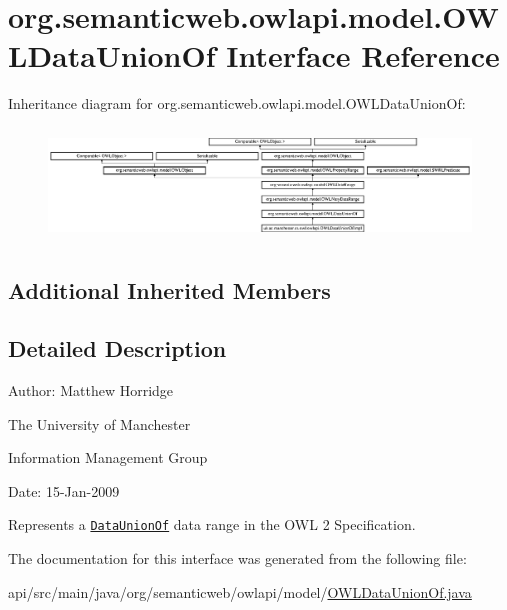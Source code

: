 \hypertarget{interfaceorg_1_1semanticweb_1_1owlapi_1_1model_1_1_o_w_l_data_union_of}{\section{org.\-semanticweb.\-owlapi.\-model.\-O\-W\-L\-Data\-Union\-Of Interface Reference}
\label{interfaceorg_1_1semanticweb_1_1owlapi_1_1model_1_1_o_w_l_data_union_of}
}
Inheritance diagram for org.\-semanticweb.\-owlapi.\-model.\-O\-W\-L\-Data\-Union\-Of\-:\begin{figure}[H]
\begin{center}
\leavevmode
\includegraphics[height=3.006135cm]{interfaceorg_1_1semanticweb_1_1owlapi_1_1model_1_1_o_w_l_data_union_of}
\end{center}
\end{figure}
\subsection*{Additional Inherited Members}


\subsection{Detailed Description}
Author\-: Matthew Horridge\par
 The University of Manchester\par
 Information Management Group\par
 Date\-: 15-\/\-Jan-\/2009 

Represents a \href{http://www.w3.org/TR/2009/REC-owl2-syntax-20091027/#Union_of_Data_Ranges}{\tt Data\-Union\-Of} data range in the O\-W\-L 2 Specification. 

The documentation for this interface was generated from the following file\-:\begin{DoxyCompactItemize}
\item 
api/src/main/java/org/semanticweb/owlapi/model/\hyperlink{_o_w_l_data_union_of_8java}{O\-W\-L\-Data\-Union\-Of.\-java}\end{DoxyCompactItemize}
